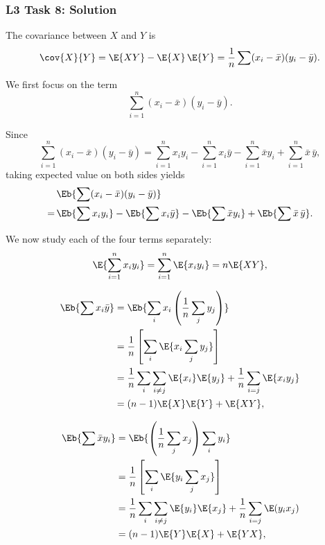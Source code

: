 \documentclass[compress]{beamer}\usepackage[]{graphicx}\usepackage[]{xcolor}
\begin{document}
\begin{frame}
  \frametitle{L3 Task 8: Solution}
    The covariance between $X$ and $Y$ is
      \[ \cov{X}{Y} = \E{XY} - \E{X}\,\E{Y} = \frac{1}{n} \sum (x_i-\bar{x})(y_i-\bar{y}). \]

    We first focus on the term
      \[ \sum_{i=1}^n (x_i-\bar{x})(y_i-\bar{y}). \]

    Since
      \[ \sum_{i=1}^n (x_i-\bar{x})(y_i-\bar{y}) = \sum_{i=1}^n x_i y_i - \sum_{i=1}^nx_i \bar{y} - \sum_{i=1}^n \bar{x}y_i + \sum_{i=1}^n \bar{x}\,\bar{y}, \]
    taking expected value on both sides yields
      \begin{equation*}
        \begin{aligned}
          &\Eb{ \sum (x_i - \bar{x})(y_i - \bar{y}) } \\
          =\, &\Eb{ \sum x_i y_i } - \Eb{ \sum x_i \bar{y} }
          - \Eb{ \sum \bar{x} y_i } + \Eb{ \sum \bar{x}\,\bar{y}}.
        \end{aligned}
      \end{equation*}

    We now study each of the four terms separately:
    \[ \E{\sum_{i=1}^n x_i y_i} = \sum_{i=1}^n \E{x_i y_i} = n \E{XY}, \]

    \begin{equation*}
      \begin{aligned}
        \Eb{ \sum x_i \bar{y} } &= \Eb{ \sum_i x_i \left( \frac{1}{n} \sum_j y_j \right) } \\
          &= \frac{1}{n} \left[ \sum_i \E{ x_i \sum_j y_j } \right] \\
          &= \frac{1}{n} \sum_{i} \sum_{i \neq j} \E{x_i}\E{y_j} + \frac{1}{n} \sum_{i=j} \E{x_i y_j} \\
          &= (n-1)\E{X}\E{Y} + \E{XY},
      \end{aligned}
    \end{equation*}

    \begin{equation*}
      \begin{aligned}
        \Eb{ \sum \bar{x} y_i } &= \Eb{ \left( \frac{1}{n} \sum_j x_j \right) \sum_i y_i } \\
          &= \frac{1}{n} \left[ \sum_i \E{ y_i \sum_{j} x_j } \right] \\
          &= \frac{1}{n} \sum_i \sum_{i \neq j} \E{y_i}\E{x_j} + \frac{1}{n}\sum_{i=j} \E(y_i x_j)\\
          &= (n-1)\E{Y}\E{X} + \E{YX},
      \end{aligned}
    \end{equation*}


\end{frame}
\end{document}
